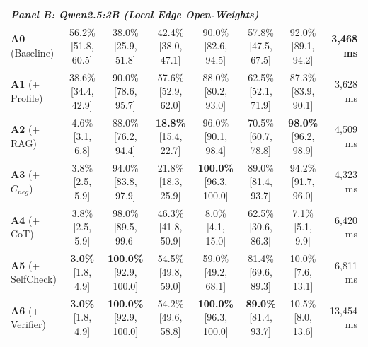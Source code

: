 \begin{table}[t]
\begin{tabular}{lccccccr}
\midrule
\multicolumn{8}{l}{\textit{\textbf{Panel B: Qwen2.5:3B (Local Edge Open-Weights)}}} \\
\textbf{A0} (Baseline) & 56.2\% [51.8, 60.5] & 38.0\% [25.9, 51.8] & 42.4\% [38.0, 47.1] & 90.0\% [82.6, 94.5] & 57.8\% [47.5, 67.5] & 92.0\% [89.1, 94.2] & \textbf{3,468 ms} \\
\textbf{A1} (+ Profile) & 38.6\% [34.4, 42.9] & 90.0\% [78.6, 95.7] & 57.6\% [52.9, 62.0] & 88.0\% [80.2, 93.0] & 62.5\% [52.1, 71.9] & 87.3\% [83.9, 90.1] & 3,628 ms \\
\textbf{A2} (+ RAG) & 4.6\% [3.1, 6.8] & 88.0\% [76.2, 94.4] & \textbf{18.8\%} [15.4, 22.7] & 96.0\% [90.1, 98.4] & 70.5\% [60.7, 78.8] & \textbf{98.0\%} [96.2, 98.9] & 4,509 ms \\
\textbf{A3} (+ $C_{neg}$) & 3.8\% [2.5, 5.9] & 94.0\% [83.8, 97.9] & 21.8\% [18.3, 25.9] & \textbf{100.0\%} [96.3, 100.0] & 89.0\% [81.4, 93.7] & 94.2\% [91.7, 96.0] & 4,323 ms \\
\textbf{A4} (+ CoT) & 3.8\% [2.5, 5.9] & 98.0\% [89.5, 99.6] & 46.3\% [41.8, 50.9] & 8.0\% [4.1, 15.0] & 62.5\% [30.6, 86.3] & 7.1\% [5.1, 9.9] & 6,420 ms \\
\textbf{A5} (+ SelfCheck) & \textbf{3.0\%} [1.8, 4.9] & \textbf{100.0\%} [92.9, 100.0] & 54.5\% [49.8, 59.0] & 59.0\% [49.2, 68.1] & 81.4\% [69.6, 89.3] & 10.0\% [7.6, 13.1] & 6,811 ms \\
\textbf{A6} (+ Verifier) & \textbf{3.0\%} [1.8, 4.9] & \textbf{100.0\%} [92.9, 100.0] & 54.2\% [49.6, 58.8] & \textbf{100.0\%} [96.3, 100.0] & \textbf{89.0\%} [81.4, 93.7] & 10.5\% [8.0, 13.6] & 13,454 ms \\
\bottomrule
\end{tabular}
\end{table}
